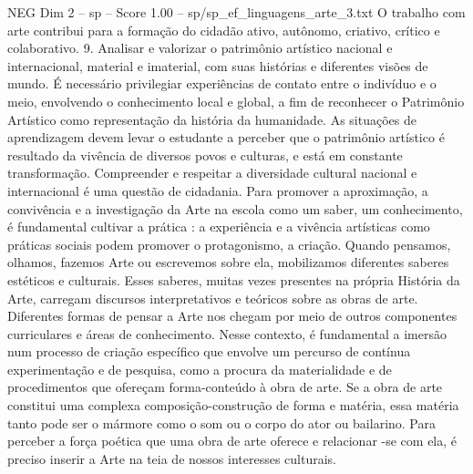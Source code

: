 \begin{textsample}{NEG Dim 2 – sp – Score 1.00 – sp/sp\_ef\_linguagens\_arte\_3.txt}
O trabalho com arte contribui para a formação do cidadão ativo, autônomo, criativo, crítico e colaborativo. 9.
Analisar e valorizar o patrimônio artístico nacional e internacional, material e imaterial, com suas histórias e diferentes visões de mundo.
É necessário privilegiar experiências de contato entre o indivíduo e o meio, envolvendo o conhecimento local e global, a fim de reconhecer o Patrimônio Artístico como representação da história da humanidade.
As situações de aprendizagem devem levar o estudante a perceber que o patrimônio artístico é resultado da vivência de diversos povos e culturas, e está em constante transformação.
Compreender e respeitar a diversidade cultural nacional e internacional é uma questão de cidadania.
Para promover a aproximação, a convivência e a investigação da Arte na escola como um saber, um conhecimento, é fundamental cultivar a prática : a experiência e a vivência artísticas como práticas sociais podem promover o protagonismo, a criação.
Quando pensamos, olhamos, fazemos Arte ou escrevemos sobre ela, mobilizamos diferentes saberes estéticos e culturais.
Esses saberes, muitas vezes presentes na própria História da Arte, carregam discursos interpretativos e teóricos sobre as obras de arte.
Diferentes formas de pensar a Arte nos chegam por meio de outros componentes curriculares e áreas de conhecimento.
Nesse contexto, é fundamental a imersão num processo de criação específico que envolve um percurso de contínua experimentação e de pesquisa, como a procura da materialidade e de procedimentos que ofereçam forma-conteúdo à obra de arte.
Se a obra de arte constitui uma complexa composição-construção de forma e matéria, essa matéria tanto pode ser o mármore como o som ou o corpo do ator ou bailarino.
Para perceber a força poética que uma obra de arte oferece e relacionar -se com ela, é preciso inserir a Arte na teia de nossos interesses culturais.

\end{textsample}
